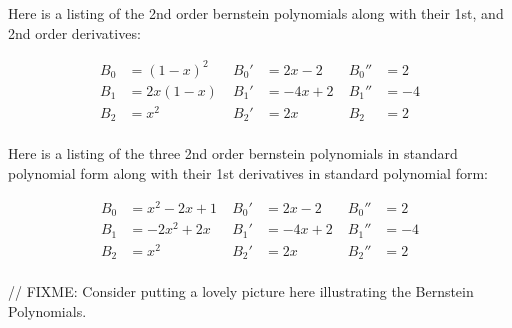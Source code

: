 \documentclass[12pt, letterpaper]{article}
\begin{document}
Here is a listing of the 2nd order bernstein polynomials along with their 1st, and 2nd order derivatives:

\begin{align*}
B_{0} &= (1 - x)^{2} \;& B_{0}' &= 2x - 2 \; & B_{0}'' &= 2\\
B_{1} &= 2x(1-x) \;& B_{1}' &= -4x + 2 \; & B_{1}'' &= -4\\
B_{2} &= x^{2} \;& B_{2}' &= 2x \; & B_{2} &= 2\\
\end{align*}


Here is a listing of the three 2nd order bernstein polynomials in standard polynomial form along with their 1st derivatives in standard polynomial form:

\begin{align*}
B_{0} &= x^{2} - 2x + 1 \; & B_{0}' &= 2x - 2 \; & B_{0}'' &= 2\\
B_{1} &= -2x^{2} + 2x \; & B_{1}' &= -4x + 2 \; &B_{1}'' &= -4\\
B_{2} &= x^{2} \; & B_{2}' &= 2x \; &B_{2}'' &= 2\\
\end{align*}

// FIXME: Consider putting a lovely picture here illustrating the Bernstein Polynomials.

\newpage

\end{document}
